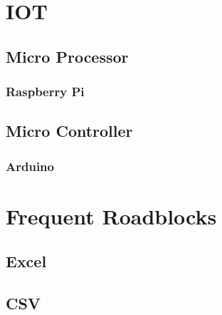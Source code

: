 \chapter{IOT}

\section{Micro Processor}

\subsection{Raspberry Pi}

\section{Micro Controller}

\subsection{Arduino}


\chapter{Frequent Roadblocks}

\section{Excel}

\section{CSV}
